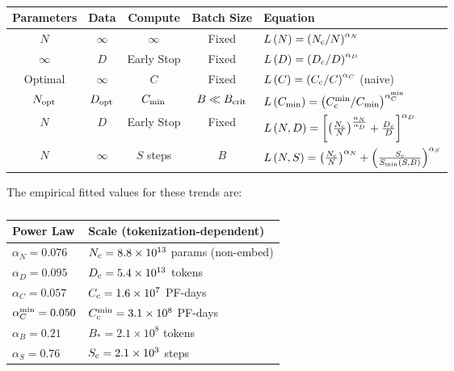 \documentclass[english]{article}
\begin{document}
\begin{table}[h!]
\centering
\vspace{-0.5em}
\begin{tabular}{|c|c|c|c|l|}
\hline 
\textbf{Parameters}  & \textbf{Data}  & \textbf{Compute}  & \textbf{Batch Size}  & \textbf{Equation}\tabularnewline
\hline 
\hline 
$N$  & $\infty$  & \multicolumn{1}{c|}{$\infty$ } & Fixed  & $L\left(N\right)=\left(N_{{\rm c}}/N\right)^{\alpha_{N}}$\tabularnewline
\hline 
$\infty$  & $D$  & \multicolumn{1}{c|}{Early Stop } & Fixed  & $L\left(D\right)=\left(D_{{\rm c}}/D\right)^{\alpha_{D}}$\tabularnewline
\hline 
Optimal  & $\infty$  & $C$  & Fixed  & $L\left(C\right)=\left(C_{{\rm c}}/C\right)^{\alpha_{C}}$ (naive)\tabularnewline
\hline 
$N_{{\rm opt}}$ & $D_{{\rm opt}}$ & $C_{{\rm min}}$  & $B\ll B_{{\rm crit}}$  & $L\left(C_{{\rm min}}\right)=\left(C_{{\rm c}}^{{\rm min}}/C_{{\rm min}}\right)^{\alpha_{C}^{{\rm min}}}$\tabularnewline
\hline 
$N$  & $D$  & \multicolumn{1}{c|}{Early Stop } & Fixed  & $L\left(N,D\right)=\left[\left(\frac{N_{{\rm c}}}{N}\right)^{\frac{\alpha_{N}}{\alpha_{D}}}+\frac{D_{c}}{D}\right]^{\alpha_{D}}$\tabularnewline
\hline 
$N$  & $\infty$  & $S$ steps & $B$  & $L\left(N,S\right)=\left(\frac{N_{{\rm c}}}{N}\right)^{\alpha_{N}}+\left(\frac{S_{{\rm c}}}{S_{{\rm min}}\left(S,B\right)}\right)^{\alpha_{S}}$\tabularnewline
\hline 
\end{tabular}
\vspace{0.5em}
\caption[Key trend equations]{}
\vspace{-1em}
\end{table}

The empirical fitted values for these trends are:


\begin{table}[h!]
\centering
\vspace{-0.5em}
\begin{tabular}{|l|l|}
\hline 
\textbf{Power Law}  & \textbf{Scale (tokenization-dependent)}\tabularnewline
\hline 
\hline 
$\alpha_{N}=0.076$  & $N_{{\rm c}}=8.8\times10^{13}$ params (non-embed)\tabularnewline
\hline 
$\alpha_{D}=0.095$  & $D_{{\rm c}}=5.4\times10^{13}$ tokens\tabularnewline
\hline 
$\alpha_{C}=0.057$  & $C_{{\rm c}}=1.6\times10^{7}$ PF-days\tabularnewline
\hline 
$\alpha_{C}^{{\rm min}}=0.050$  & $C_{{\rm c}}^{{\rm min}}=3.1\times10^{8}$ PF-days\tabularnewline
\hline 
$\alpha_{B}=0.21$  & $B_{\ast}=2.1\times10^{8}$ tokens\tabularnewline
\hline 
$\alpha_{S}=0.76$  & $S_{{\rm c}}=2.1\times10^{3}$ steps\tabularnewline
\hline 
\end{tabular}
\vspace{0.5em}
\caption[Key parameters to trend fits]{}
\vspace{-1em}
\end{table}
\end{document}

